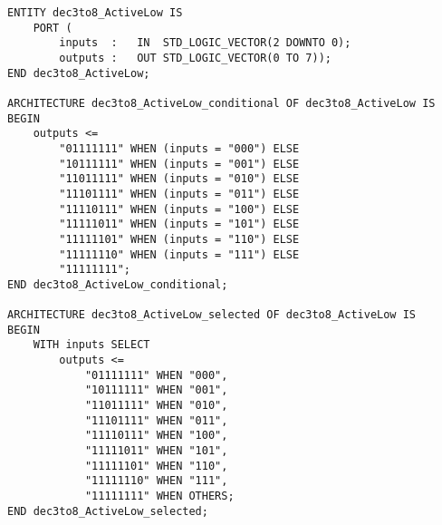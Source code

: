 \begin{enumerate}
\begin{minipage}{1\linewidth}
\begin{lstlisting}
ENTITY dec3to8_ActiveLow IS
	PORT (
		inputs	:	IN	STD_LOGIC_VECTOR(2 DOWNTO 0);
		outputs	:	OUT	STD_LOGIC_VECTOR(0 TO 7));
END dec3to8_ActiveLow;

ARCHITECTURE dec3to8_ActiveLow_conditional OF dec3to8_ActiveLow IS
BEGIN
	outputs <=
		"01111111" WHEN (inputs = "000") ELSE
		"10111111" WHEN (inputs = "001") ELSE
		"11011111" WHEN (inputs = "010") ELSE
		"11101111" WHEN (inputs = "011") ELSE
		"11110111" WHEN (inputs = "100") ELSE
		"11111011" WHEN (inputs = "101") ELSE
		"11111101" WHEN (inputs = "110") ELSE
		"11111110" WHEN (inputs = "111") ELSE
		"11111111";
END dec3to8_ActiveLow_conditional;

ARCHITECTURE dec3to8_ActiveLow_selected OF dec3to8_ActiveLow IS
BEGIN
	WITH inputs SELECT
		outputs <=
			"01111111" WHEN "000",
			"10111111" WHEN "001",
			"11011111" WHEN "010",
			"11101111" WHEN "011",
			"11110111" WHEN "100",
			"11111011" WHEN "101",
			"11111101" WHEN "110",
			"11111110" WHEN "111",
			"11111111" WHEN OTHERS;
END dec3to8_ActiveLow_selected;
		\end{lstlisting}
	\end{minipage}
\end{enumerate}

